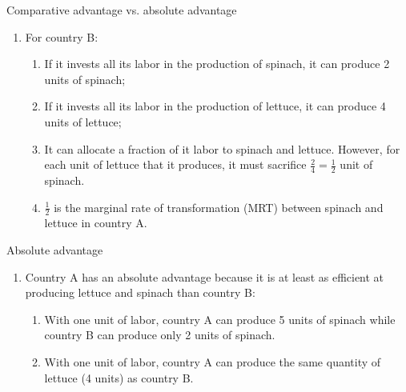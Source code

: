 \documentclass[table,xcolor=pdftex,dvipsnames]{beamer}\usepackage[]{graphicx}\usepackage[]{color}
\begin{document}

\begin{frame}{Comparative advantage vs. absolute advantage}
\begin{enumerate}[label=\textbullet]
  \item For country B:
      \begin{enumerate}[label=-]
          \item If it invests all its labor in the production of spinach, it can produce 2 units of spinach;
          \item If it invests all its labor in the production of lettuce, it can produce 4 units of lettuce;
          \item It can allocate a fraction of it labor to spinach and lettuce. However, for each unit of lettuce that it produces, it must sacrifice $\frac{2}{4} = \frac{1}{2}$ unit of spinach.
          \item $\frac{1}{2}$ is the marginal rate of transformation (MRT) between spinach and lettuce in country A.
      \end{enumerate}
\end{enumerate}
\end{frame}


\begin{frame}{Absolute advantage}
\begin{enumerate}[label=\textbullet]
  \item Country A has an absolute advantage because it is at least as efficient at producing lettuce and spinach than country B:
      \begin{enumerate}[label=-]
          \item With one unit of labor, country A can produce 5 units of spinach while country B can produce only 2 units of spinach.
          \item With one unit of labor, country A can produce the same quantity of lettuce (4 units) as country B.
      \end{enumerate}
\end{enumerate}
\end{frame}

\end{document}
